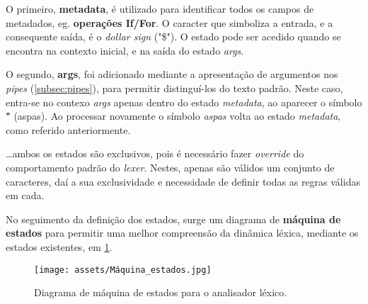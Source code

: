 \documentclass[../relatorio.tex]{subfiles}
\begin{document}
    \inputminted[firstline=13, lastline=16]{py}{../pandoc_lex.py}

    O primeiro, \textbf{metadata}, é utilizado para identificar todos os
    campos de metadados, eg. \textbf{operações If/For}.
    O caracter que simboliza a entrada, e a consequente saída, é o 
    \textit{dollar sign} ("\$").
    O estado pode ser acedido quando se encontra na contexto inicial, e
    na saída do estado \textit{args}.

    O segundo, \textbf{args}, foi adicionado mediante a apresentação 
    de argumentos nos \textit{pipes} (\ref{subsec:pipes}), para permitir 
    distinguí-los do texto padrão. 
    Neste caso, entra-se no contexo \textit{args} apenas dentro do 
    estado \textit{metadata}, ao aparecer o símbolo \textbf{"} (aspas).
    Ao processar novamente o símbolo \textit{aspas} volta ao estado \textit{metadata},
    como referido anteriormente.

    \dots ambos os estados são exclusivos, pois é necessário fazer \textit{override}
    do comportamento padrão do \textit{lexer}.
    Nestes, apenas são válidos um conjunto de caracteres, daí a sua exclusividade e 
    necessidade de definir todas as regras válidas em cada.

    No seguimento da definição dos estados, surge um diagrama de 
    \textbf{máquina de estados} para permitir uma melhor compreensão da
    dinâmica léxica, mediante os estados existentes, em \ref{fig:state_machine}.

    \begin{figure}[!ht]
        \centering
        \texttt{[image: assets/Máquina\_estados.jpg]}
        \caption{Diagrama de máquina de estados para o analisador léxico.}
        \label{fig:state_machine}
    \end{figure}
\end{document}
